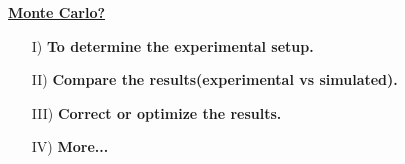 \documentclass[xcolor=rgb]{beamer}
\begin{document}
\begin{frame}{\href{https://gfycat.com/bewitchedviciousaltiplanochinchillamouse-irrational-numbers-approximation}{\textbf{Monte Carlo?}}}

\vspace{-3cm}
\begin{enumerate}
  \item[I)] \textbf{To determine the experimental setup.}
  \item[II)] \textbf{Compare the results(experimental vs simulated).}
  \item[III)] \textbf{Correct or optimize the results.}
  \item[IV)] \textbf{More...}


\end{enumerate}



\end{frame}
\end{document}
